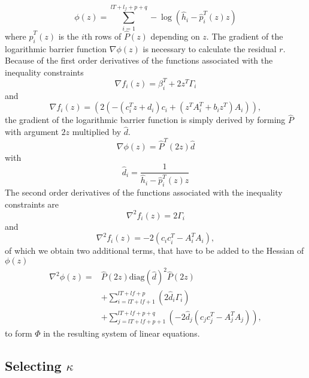 \documentclass[letterpaper, 10 pt, conference]{ieeeconf}  %
\begin{document}
\begin{equation}
	\phi(z)=\sum_{i=1}^{lT+l_{f}+p+q}-\log \left ( \hat{h}_{i}-\hat{p}_{i}^T(z)z \right )
\end{equation}
where $\hat{p}_{i}^T(z)$ is the $i$th rows of $\hat{P}(z)$ depending on $z$. The gradient of the logarithmic barrier function $\nabla\phi(z)$  is necessary to calculate the residual $r$. Because of the first order derivatives of the functions associated with the inequality constraints
\begin{equation}
  \nabla f_{i}\left (z  \right )=\beta_{i}^{T}+2z^{T}\Gamma_{i}
\end{equation}
and
\begin{equation*}
  \nabla f_{i}\left (z  \right )=\left (2\left(-\left(c_{i}^{T}z + d_{i}\right )c_{i} + \left(z^{T}A_{i}^{T} + b_{i}z^{T} \right )A_{i}\right) \right),
\end{equation*}
the gradient of the logarithmic barrier function is simply derived by forming $\hat{P}$ with argument $2z$ multiplied by $\hat{d}$.
\begin{equation}
	\nabla\phi(z)=\hat{P}^T(2z)\hat{d}
\end{equation}
with
\begin{equation}
	\hat{d}_i=\frac{1}{\hat{h}_{i}-\hat{p}_{i}^T(z)z}
\end{equation}
The second order derivatives of the functions associated with the inequality constraints are
\begin{equation}
 \nabla^{2} f_{i}\left (z  \right )=2\Gamma_{i}
\end{equation}
and
\begin{equation}
  \nabla^{2} f_{i}\left (z  \right )= -2 \left( c_{i}c_{i}^{T} - A_{i}^{T} A_{i}  \right),
\end{equation}
of which we obtain two additional terms, that have to be added to the Hessian of $\phi(z)$
\begin{equation}\begin{split}
	\nabla^{2}\phi(z)=&\hat{P}(2z)\text{diag}(\hat{d})^{2}\hat{P}(2z)\\
	&+\sum_{i=lT+lf+1}^{lT+lf+p}\left (2\hat{d}_{i}\Gamma_{i}  \right )\\
	&+\sum_{j=lT+lf+p+1}^{lT+lf+p+q}\left (-2\hat{d}_{j} \left( c_{j}c_{j}^{T} - A_{j}^{T} A_{j}  \right)  \right ),
\end{split}\end{equation}
to form $\Phi$ in the resulting system of linear equations.

\subsection{Selecting $\kappa$}
\end{document}
